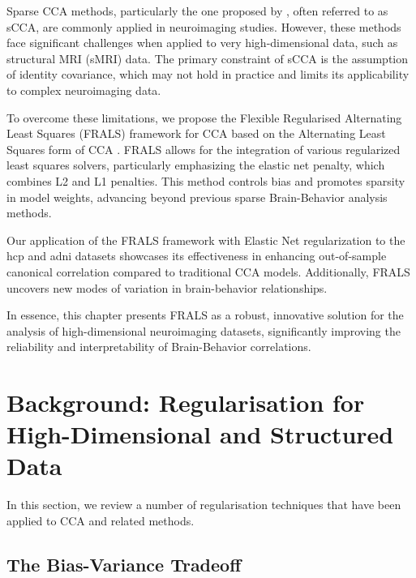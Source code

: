 Sparse CCA methods, particularly the one proposed by \citet{witten2009penalized}, often referred to as sCCA, are commonly applied in neuroimaging studies. However, these methods face significant challenges when applied to very high-dimensional data, such as structural MRI (sMRI) data. The primary constraint of sCCA is the assumption of identity covariance, which may not hold in practice and limits its applicability to complex neuroimaging data.

To overcome these limitations, we propose the Flexible Regularised Alternating Least Squares (FRALS) framework for CCA based on the Alternating Least Squares form of CCA \citep{golub1995canonical}.
FRALS allows for the integration of various regularized least squares solvers, particularly emphasizing the elastic net penalty, which combines L2 and L1 penalties.
This method controls bias and promotes sparsity in model weights, advancing beyond previous sparse Brain-Behavior analysis methods.

Our application of the FRALS framework with Elastic Net regularization to the \acrshort{hcp} and \acrshort{adni} datasets showcases its effectiveness in enhancing out-of-sample canonical correlation compared to traditional CCA models.
Additionally, FRALS uncovers new modes of variation in brain-behavior relationships.

In essence, this chapter presents FRALS as a robust, innovative solution for the analysis of high-dimensional neuroimaging datasets, significantly improving the reliability and interpretability of Brain-Behavior correlations.

\section{Background: Regularisation for High-Dimensional and Structured Data}\label{sec:background}

In this section, we review a number of regularisation techniques that have been applied to CCA and related methods.

\subsection{The Bias-Variance Tradeoff}

